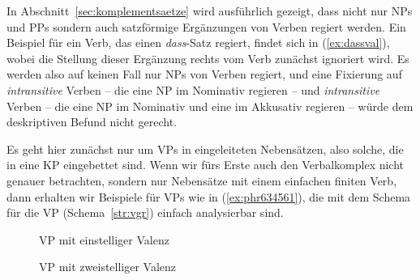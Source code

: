 In Abschnitt~\ref{sec:komplementsaetze} wird ausführlich gezeigt, dass nicht nur NPs und PPs sondern auch satzförmige Ergänzungen von Verben regiert werden.
Ein Beispiel für ein Verb, das einen \textit{dass}-Satz regiert, findet sich in (\ref{ex:dassval}), wobei die Stellung dieser Ergänzung rechts vom Verb zunächst ignoriert wird.
Es werden also auf keinen Fall nur NPs von Verben regiert, und eine Fixierung auf \textit{intransitive} Verben -- die eine NP im Nominativ regieren -- und \textit{intransitive} Verben -- die eine NP im Nominativ und eine im Akkusativ regieren -- würde dem deskriptiven Befund nicht gerecht.

\begin{exe}
\end{exe}

Es geht hier zunächst nur um VPs in eingeleiteten Nebensätzen, also solche, die in eine KP eingebettet sind.
Wenn wir fürs Erste auch den Verbalkomplex nicht genauer betrachten, sondern nur Nebensätze mit einem einfachen finiten Verb, dann erhalten wir Beispiele für VPs wie in (\ref{ex:phr634561}), die mit dem Schema für die VP (Schema~\ref{str:vgr}) einfach analysierbar sind.

\begin{exe}
\ex\label{ex:phr634561}\begin{xlist}
\end{xlist} 
\end{exe}

\begin{figure}
  \centering
  \caption{VP mit einstelliger Valenz}
  \label{fig:vgreinstellig}
\end{figure}

\begin{figure}
  \centering
  \caption{VP mit zweistelliger Valenz}
  \label{fig:vgrzweistellig}
\end{figure}

